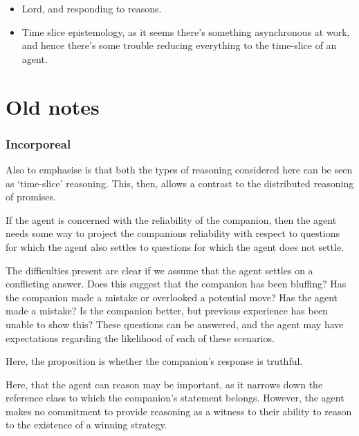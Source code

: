 \documentclass[10pt]{article}
\newcommand{\hozline}[0]{%
  \noindent\hdashrule[0.5ex][c]{\textwidth}{.1pt}{}
}
\begin{document}
\begin{itemize}
\item Lord, and responding to reasons.
\item Time slice epistemology, as it seems there's something asynchronous at work, and hence there's some trouble reducing everything to the time-slice of an agent.
\end{itemize}

\newpage

\hozline

\section{Old notes}
\label{sec:old-notes}



\subsubsection{Incorporeal}
\label{sec:incorporeal}

\begin{note}
  Also to emphasise is that both the types of reasoning considered here can be seen as `time-slice' reasoning.
  This, then, allows a contrast to the distributed reasoning of promises.
\end{note}

If the agent is concerned with the reliability of the companion, then the agent needs some way to project the companions reliability with respect to questions for which the agent also settles to questions for which the agent does not settle.

The difficulties present are clear if we assume that the agent settles on a conflicting answer.
Does this suggest that the companion has been bluffing?
Has the companion made a mistake or overlooked a potential move?
Has the agent made a mistake?
Is the companion better, but previous experience has been unable to show this?
These questions can be answered, and the agent may have expectations regarding the likelihood of each of these scenarios.

Here, the proposition is whether the companion's response is truthful.

Here, that the agent can reason may be important, as it narrows down the reference class to which the companion's statement belongs.
However, the agent makes no commitment to provide reasoning as a witness to their ability to reason to the existence of a winning strategy.
\end{document}
